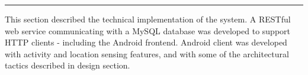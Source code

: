 \vspace{3em}
\hrule
This section described the technical implementation of the system. A RESTful web service communicating with a MySQL database was developed to support HTTP clients - including the Android frontend. Android client was developed with activity and location sensing features, and with some of the architectural tactics described in design section. 

